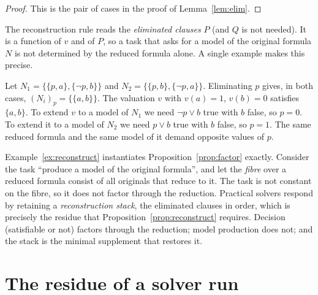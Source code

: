 \begin{proof}
This is the pair of cases in the proof of Lemma~\ref{lem:elim}.
\end{proof}

The reconstruction rule reads the \emph{eliminated clauses} $P$ (and $Q$ is not needed). It is a function of $v$ and of $P$, so a task that asks for a model of the original formula $N$ is not determined by the reduced formula alone. A single example makes this precise.

\begin{example}
\label{ex:reconstruct}
Let $N_1=\{\{p,a\},\{\neg p,b\}\}$ and $N_2=\{\{p,b\},\{\neg p,a\}\}$. Eliminating $p$ gives, in both cases, $(N_i)_p=\{\{a,b\}\}$. The valuation $v$ with $v(a)=1$, $v(b)=0$ satisfies $\{a,b\}$. To extend $v$ to a model of $N_1$ we need $\neg p\vee b$ true with $b$ false, so $p=0$. To extend it to a model of $N_2$ we need $p\vee b$ true with $b$ false, so $p=1$. The same reduced formula and the same model of it demand opposite values of $p$.
\end{example}

Example~\ref{ex:reconstruct} instantiates Proposition~\ref{prop:factor} exactly. Consider the task ``produce a model of the original formula'', and let the \emph{fibre} over a reduced formula consist of all originals that reduce to it. The task is not constant on the fibre, so it does not factor through the reduction. Practical solvers respond by retaining a \emph{reconstruction stack}, the eliminated clauses in order, which is precisely the residue that Proposition~\ref{prop:reconstruct} requires. Decision (satisfiable or not) factors through the reduction; model production does not; and the stack is the minimal supplement that restores it.

\section{The residue of a solver run}
\label{sec:sat-residue}

